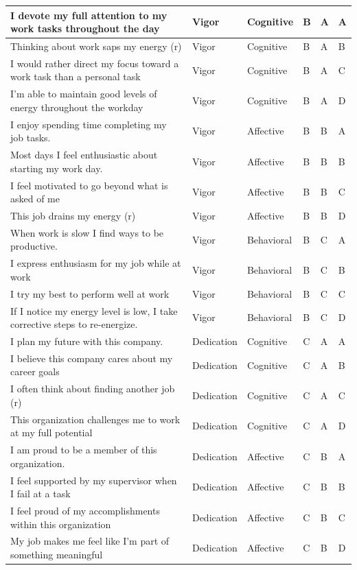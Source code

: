 \documentclass[
]{book}
\begin{document}
\begin{table}
\begin{tabular}[t]{l|l|l|l|l|l}
I devote my full attention to my work tasks throughout the day & Vigor & Cognitive & B & A & A\\
\hline
Thinking about work saps my energy (r) & Vigor & Cognitive & B & A & B\\
\hline
I would rather direct my focus toward a work task than a personal task & Vigor & Cognitive & B & A & C\\
\hline
I’m able to maintain good levels of energy throughout the workday & Vigor & Cognitive & B & A & D\\
\hline
I enjoy spending time completing my job tasks. & Vigor & Affective & B & B & A\\
\hline
Most days I feel enthusiastic about starting my work day. & Vigor & Affective & B & B & B\\
\hline
I feel motivated to go beyond what is asked of me & Vigor & Affective & B & B & C\\
\hline
This job drains my energy (r) & Vigor & Affective & B & B & D\\
\hline
When work is slow I find ways to be productive. & Vigor & Behavioral & B & C & A\\
\hline
I express enthusiasm for my job while at work & Vigor & Behavioral & B & C & B\\
\hline
I try my best to perform well at work & Vigor & Behavioral & B & C & C\\
\hline
If I notice my energy level is low, I take corrective steps to re-energize. & Vigor & Behavioral & B & C & D\\
\hline
I plan my future with this company. & Dedication & Cognitive & C & A & A\\
\hline
I believe this company cares about my career goals & Dedication & Cognitive & C & A & B\\
\hline
I often think about finding another job (r) & Dedication & Cognitive & C & A & C\\
\hline
This organization challenges me to work at my full potential & Dedication & Cognitive & C & A & D\\
\hline
I am proud to be a member of this organization. & Dedication & Affective & C & B & A\\
\hline
I feel supported by my supervisor when I fail at a task & Dedication & Affective & C & B & B\\
\hline
I feel proud of my accomplishments within this organization & Dedication & Affective & C & B & C\\
\hline
My job makes me feel like I’m part of something meaningful & Dedication & Affective & C & B & D\\

\end{tabular}
\end{table}
\end{document}

